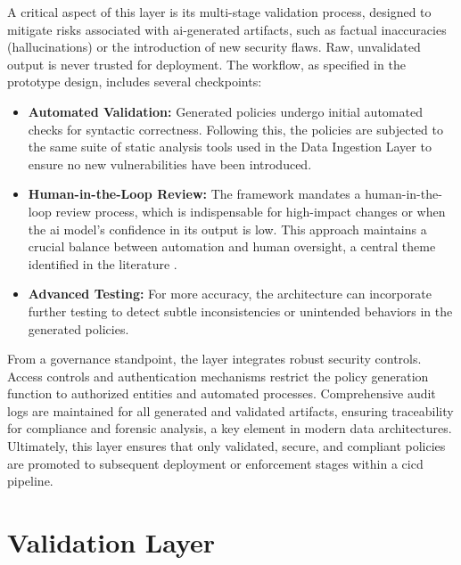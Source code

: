 A critical aspect of this layer is its multi-stage validation process, designed to mitigate risks associated with \gls{ai}-generated artifacts, such as factual inaccuracies (hallucinations) or the introduction of new security flaws. Raw, unvalidated output is never trusted for deployment. The workflow, as specified in the prototype design, includes several checkpoints:

\begin{itemize}
    \item \textbf{Automated Validation:} Generated policies undergo initial automated checks for syntactic correctness. Following this, the policies are subjected to the same suite of static analysis tools used in the Data Ingestion Layer to ensure no new vulnerabilities have been introduced.

    \item \textbf{Human-in-the-Loop Review:} The framework mandates a human-in-the-loop review process, which is indispensable for high-impact changes or when the \gls{ai} model's confidence in its output is low. This approach maintains a crucial balance between automation and human oversight, a central theme identified in the literature \cite{lim_explicate_2025}.
    
    \item \textbf{Advanced Testing:} For more accuracy, the architecture can incorporate further testing to detect subtle inconsistencies or unintended behaviors in the generated policies.
\end{itemize}

From a governance standpoint, the layer integrates robust security controls. Access controls and authentication mechanisms restrict the policy generation function to authorized entities and automated processes. Comprehensive audit logs are maintained for all generated and validated artifacts, ensuring traceability for compliance and forensic analysis, a key element in modern data architectures\cite{noauthor_testbed_2025}. Ultimately, this layer ensures that only validated, secure, and compliant policies are promoted to subsequent deployment or enforcement stages within a \gls{cicd} pipeline.


\section{Validation Layer}
\label{sec:validation-layer}

